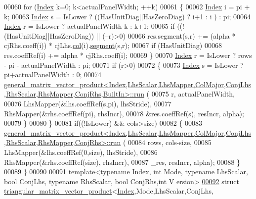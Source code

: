 \begin{DoxyCode}
00060       \textcolor{keywordflow}{for} (\hyperlink{namespace_eigen_a62e77e0933482dafde8fe197d9a2cfde}{Index} k=0; k<actualPanelWidth; ++k)
00061       \{
00062         \hyperlink{namespace_eigen_a62e77e0933482dafde8fe197d9a2cfde}{Index} i = pi + k;
00063         \hyperlink{namespace_eigen_a62e77e0933482dafde8fe197d9a2cfde}{Index} s = IsLower ? ((HasUnitDiag||HasZeroDiag) ? i+1 : i ) : pi;
00064         \hyperlink{namespace_eigen_a62e77e0933482dafde8fe197d9a2cfde}{Index} r = IsLower ? actualPanelWidth-k : k+1;
00065         \textcolor{keywordflow}{if} ((!(HasUnitDiag||HasZeroDiag)) || (--r)>0)
00066           res.segment(s,r) += (alpha * cjRhs.coeff(i)) * cjLhs.\hyperlink{group___sparse_core___module_a3531e3e2098507a069a368d72d46471e}{col}(i).\hyperlink{group___sparse_core___module_adf94a8461a773fb4b0daedaa9980b054}{segment}(s,r);
00067         \textcolor{keywordflow}{if} (HasUnitDiag)
00068           res.coeffRef(i) += alpha * cjRhs.coeff(i);
00069       \}
00070       \hyperlink{namespace_eigen_a62e77e0933482dafde8fe197d9a2cfde}{Index} r = IsLower ? rows - pi - actualPanelWidth : pi;
00071       \textcolor{keywordflow}{if} (r>0)
00072       \{
00073         \hyperlink{namespace_eigen_a62e77e0933482dafde8fe197d9a2cfde}{Index} s = IsLower ? pi+actualPanelWidth : 0;
00074         
      \hyperlink{struct_eigen_1_1internal_1_1general__matrix__vector__product}{
      general\_matrix\_vector\_product<Index,LhsScalar,LhsMapper,ColMajor,ConjLhs,RhsScalar,RhsMapper,ConjRhs,BuiltIn>::run}
      (
00075             r, actualPanelWidth,
00076             LhsMapper(&lhs.coeffRef(s,pi), lhsStride),
00077             RhsMapper(&rhs.coeffRef(pi), rhsIncr),
00078             &res.coeffRef(s), resIncr, alpha);
00079       \}
00080     \}
00081     \textcolor{keywordflow}{if}((!IsLower) && cols>size)
00082     \{
00083       
      \hyperlink{struct_eigen_1_1internal_1_1general__matrix__vector__product}{general\_matrix\_vector\_product<Index,LhsScalar,LhsMapper,ColMajor,ConjLhs,RhsScalar,RhsMapper,ConjRhs>::run}
      (
00084           rows, cols-size,
00085           LhsMapper(&lhs.coeffRef(0,size), lhsStride),
00086           RhsMapper(&rhs.coeffRef(size), rhsIncr),
00087           \_res, resIncr, alpha);
00088     \}
00089   \}
00090 
00091 \textcolor{keyword}{template}<\textcolor{keyword}{typename} Index, \textcolor{keywordtype}{int} Mode, \textcolor{keyword}{typename} LhsScalar, \textcolor{keywordtype}{bool} ConjLhs, \textcolor{keyword}{typename} RhsScalar, \textcolor{keywordtype}{bool} ConjRhs,\textcolor{keywordtype}{int} V
      ersion>
\hyperlink{struct_eigen_1_1internal_1_1triangular__matrix__vector__product_3_01_index_00_01_mode_00_01_lhs_ba3b9cdc80cdaeff44c1d1ed32cbe15b}{00092} \textcolor{keyword}{struct }\hyperlink{struct_eigen_1_1internal_1_1triangular__matrix__vector__product}{triangular\_matrix\_vector\_product}<\hyperlink{namespace_eigen_a62e77e0933482dafde8fe197d9a2cfde}{Index},Mode,LhsScalar,ConjLhs,

\end{DoxyCode}
